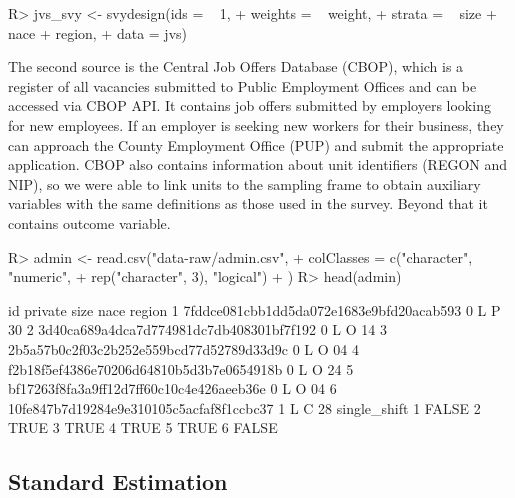\documentclass[
]{jss}
\begin{document}
\begin{CodeChunk}
\begin{CodeInput}
R> jvs_svy <- svydesign(ids = ~ 1, 
+                      weights = ~ weight,
+                      strata = ~ size + nace + region,
+                      data = jvs)
\end{CodeInput}
\end{CodeChunk}

The second source is the Central Job Offers Database (CBOP), which is a
register of all vacancies submitted to Public Employment Offices and can
be accessed via CBOP API. It contains job offers submitted by employers
looking for new employees. If an employer is seeking new workers for
their business, they can approach the County Employment Office (PUP) and
submit the appropriate application. CBOP also contains information about
unit identifiers (REGON and NIP), so we were able to link units to the
sampling frame to obtain auxiliary variables with the same definitions
as those used in the survey. Beyond that it contains
 outcome variable.

\begin{CodeChunk}
\begin{CodeInput}
R> admin <- read.csv("data-raw/admin.csv",
+                  colClasses = c("character", "numeric",
+                                 rep("character", 3), "logical")
+                  )
R> head(admin)
\end{CodeInput}
\begin{CodeOutput}
                                        id private size nace region
1 7fddce081cbb1dd5da072e1683e9bfd20acab593       0    L    P     30
2 3d40ca689a4dca7d774981dc7db408301bf7f192       0    L    O     14
3 2b5a57b0c2f03c2b252e559bcd77d52789d33d9c       0    L    O     04
4 f2b18f5ef4386e70206d64810b5d3b7e0654918b       0    L    O     24
5 bf17263f8fa3a9ff12d7ff60c10c4e426aeeb36e       0    L    O     04
6 10fe847b7d19284e9e310105c5acfaf8f1ccbc37       1    L    C     28
  single_shift
1        FALSE
2         TRUE
3         TRUE
4         TRUE
5         TRUE
6        FALSE
\end{CodeOutput}
\end{CodeChunk}

\hypertarget{standard-estimation}{%
\subsection{Standard Estimation}\label{standard-estimation}}
\end{document}
